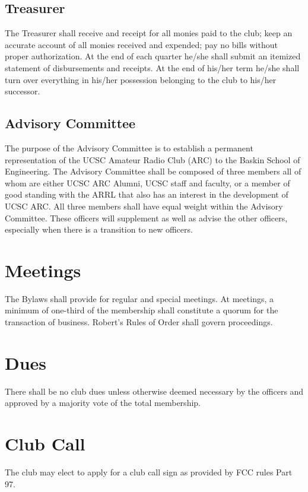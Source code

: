 \documentclass{report}
\begin{document}
\section{Treasurer}

The Treasurer shall receive and receipt for all monies paid to the club; keep an accurate account of all monies received and expended; pay no bills without proper authorization. At the end of each quarter he/she shall submit an itemized statement of disbursements and receipts. At the end of his/her term he/she shall turn over everything in his/her possession belonging to the club to his/her successor.

\section{Advisory Committee}

The purpose of the Advisory Committee is to establish a permanent representation of the UCSC Amateur Radio Club (ARC) to the Baskin School of Engineering. The Advisory Committee shall be composed of three members all of whom are either UCSC ARC Alumni, UCSC staff and faculty, or a member of good standing with the ARRL that also has an interest in the development of UCSC ARC. All three members shall have equal weight within the Advisory Committee. These officers will supplement as well as advise the other officers, especially when there is a transition to new officers.
\noindent
\chapter{Meetings}
The Bylaws shall provide for regular and special meetings. At meetings, a minimum of one-third of the membership shall constitute a quorum for the transaction of business. Robert's Rules of Order shall govern proceedings.

\chapter{Dues}
There shall be no club dues unless otherwise deemed necessary by the officers and approved by a majority vote of the total membership.

\chapter{Club Call}
The club may elect to apply for a club call sign as provided by FCC rules Part 97.\\
\end{document}
